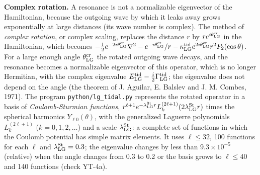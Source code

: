 \documentclass[
  10pt,
]{article}
\begin{document}
\textbf{Complex rotation.} A resonance is not a normalizable eigenvector
of the Hamiltonian, because the outgoing wave by which it leaks away
grows exponentially at large distances (its wave number is complex). The
method of \emph{complex rotation}, or complex scaling, replaces the
distance \(r\) by \(re^{i\theta^{\rm cr}_{\rm LG}}\) in the Hamiltonian,
which becomes
\(-\tfrac12e^{-2i\theta^{\rm cr}_{\rm LG}}\nabla^2-e^{-i\theta^{\rm cr}_{\rm LG}}/r-\kappa^{\rm tid}_{\rm LG}e^{2i\theta^{\rm cr}_{\rm LG}}r^2P_2(\cos\theta)\).
For a large enough angle \(\theta^{\rm cr}_{\rm LG}\) the rotated
outgoing wave decays, and the resonance becomes a normalizable
eigenvector of this operator, which is no longer Hermitian, with the
complex eigenvalue
\(E^{\rm tid}_{\rm LG}-\tfrac i2\Gamma^{\rm tid}_{\rm LG}\); the
eigenvalue does not depend on the angle (the theorem of J. Aguilar, E.
Balslev and J. M. Combes, 1971). The program
\texttt{python/lg\_tidal.py} represents the rotated operator in a basis
of \emph{Coulomb-Sturmian functions},
\(r^{\ell+1}e^{-\lambda^{\rm St}_{\rm LG}r}L^{(2\ell+1)}_{k}(2\lambda^{\rm St}_{\rm LG}r)\)
times the spherical harmonics \(Y_{\ell0}(\theta)\), with the
generalized Laguerre polynomials \(L^{(2\ell+1)}_k\) (\(k=0,1,2,\dots\))
and a scale \(\lambda^{\rm St}_{\rm LG}\): a complete set of functions
in which the Coulomb potential has simple matrix elements. It uses
\(\ell\le32\), 100 functions for each \(\ell\) and
\(\lambda^{\rm St}_{\rm LG}=0.3\); the eigenvalue changes by less than
\(9.3\times10^{-5}\) (relative) when the angle changes from 0.3 to 0.2
or the basis grows to \(\ell\le40\) and 140 functions (check YT-4a).
\end{document}
